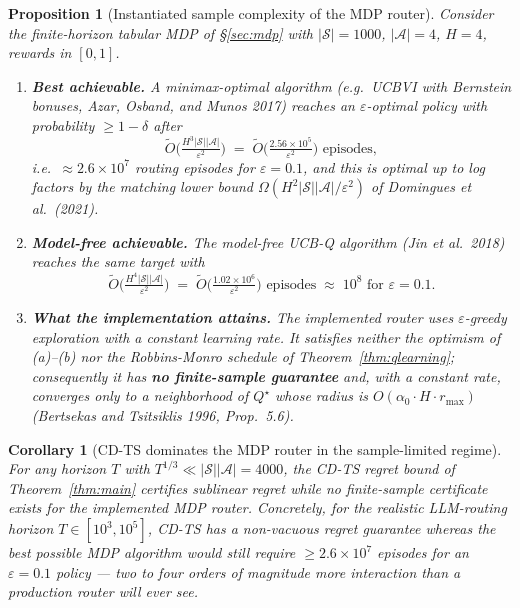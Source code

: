 \documentclass[11pt]{article}
\newtheorem{proposition}[theorem]{Proposition}
\newtheorem{corollary}[theorem]{Corollary}
\theoremstyle{definition}
\begin{document}
\begin{proposition}[Instantiated sample complexity of the MDP router]
\label{prop:mdp-sample}
Consider the finite-horizon tabular MDP of \S\ref{sec:mdp} with $|\mathcal{S}| = 1000$, $|\mathcal{A}| = 4$, $H = 4$, rewards in $[0,1]$.
\begin{enumerate}
    \item[(a)] \textbf{Best achievable.} A minimax-optimal algorithm (e.g.\ \textsc{UCBVI} with Bernstein bonuses, Azar, Osband, and Munos 2017) reaches an $\varepsilon$-optimal policy with probability $\geq 1-\delta$ after
    \[
        \widetilde{O}\!\Big( \tfrac{H^3 |\mathcal{S}| |\mathcal{A}|}{\varepsilon^2} \Big)
        \;=\; \widetilde{O}\!\Big( \tfrac{2.56 \times 10^5}{\varepsilon^2} \Big) \text{ episodes},
    \]
    i.e.\ $\approx 2.6 \times 10^7$ routing episodes for $\varepsilon = 0.1$, and this is optimal up to log factors by the matching lower bound $\Omega(H^2 |\mathcal{S}||\mathcal{A}|/\varepsilon^2)$ of Domingues et al.\ (2021).
    \item[(b)] \textbf{Model-free achievable.} The model-free \textsc{UCB-Q} algorithm (Jin et al.\ 2018) reaches the same target with
    \[
        \widetilde{O}\!\Big( \tfrac{H^4 |\mathcal{S}| |\mathcal{A}|}{\varepsilon^2} \Big)
        \;=\; \widetilde{O}\!\Big( \tfrac{1.02 \times 10^6}{\varepsilon^2} \Big) \text{ episodes}
        \;\approx\; 10^8 \text{ for } \varepsilon = 0.1.
    \]
    \item[(c)] \textbf{What the implementation attains.} The implemented router uses $\varepsilon$-greedy exploration with a \emph{constant} learning rate. It satisfies neither the optimism of (a)--(b) nor the Robbins-Monro schedule of Theorem~\ref{thm:qlearning}; consequently it has \textbf{no finite-sample guarantee} and, with a constant rate, converges only to a neighborhood of $Q^\star$ whose radius is $O(\alpha_0 \cdot H \cdot r_{\max})$ (Bertsekas and Tsitsiklis 1996, Prop.~5.6).
\end{enumerate}
\end{proposition}

\begin{corollary}[CD-TS dominates the MDP router in the sample-limited regime]
\label{cor:cdts-vs-mdp}
For any horizon $T$ with $T^{1/3} \ll |\mathcal{S}||\mathcal{A}| = 4000$, the CD-TS regret bound of Theorem~\ref{thm:main} certifies sublinear regret while no finite-sample certificate exists for the implemented MDP router. Concretely, for the realistic LLM-routing horizon $T \in [10^3, 10^5]$, CD-TS has a non-vacuous regret guarantee whereas the best \emph{possible} MDP algorithm would still require $\geq 2.6\times 10^7$ episodes for an $\varepsilon=0.1$ policy --- two to four orders of magnitude more interaction than a production router will ever see.
\end{corollary}
\end{document}

